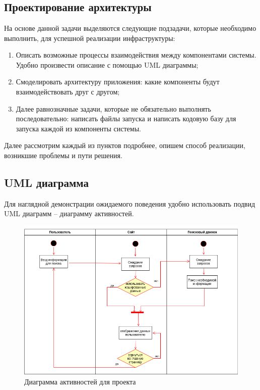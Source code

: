 \chapter{\centering{}}
\label{cha:ch_2}

\section{Проектирование архитектуры}
На основе данной задачи выделяются следующие подзадачи, которые необходимо
выполнить, для успешной реализации инфраструктуры:
\begin{enumerate}[label=\arabic*.]
    \item Описать возможные процессы взаимодействия между компонентами системы.
        Удобно произвести описание с помощью UML диаграммы;
    \item Смоделировать архитектуру приложения: какие компоненты будут
        взаимодействовать друг с другом;
    \item Далее равнозначные задачи, которые не обязательно выполнять
        последовательно: написать файлы запуска и написать кодовую базу для
        запуска каждой из компоненты системы.
\end{enumerate}

Далее рассмотрим каждый из пунктов подробнее, опишем способ реализации,
возникшие проблемы и пути решения.

\section{UML диаграмма}
Для наглядной демонстрации ожидаемого поведения удобно использовать подвид UML диаграмм -- диаграмму активностей.
\begin{figure}[H]
    \centering
    \includegraphics[scale=0.55]{inc/img/activity_diagram.png}
    \caption{Диаграмма активностей для проекта}
\end{figure}

